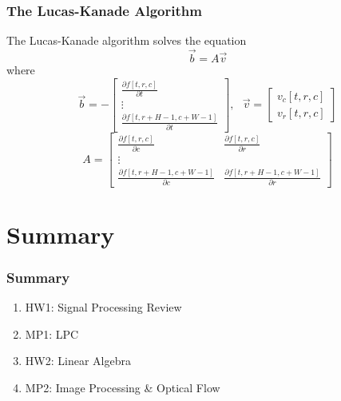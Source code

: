 \documentclass{beamer}
\begin{document}
\begin{frame}
  \frametitle{The Lucas-Kanade Algorithm}

  The Lucas-Kanade algorithm solves the equation
  \[\vec{b}=A\vec{v} \]
  where
  \[
  \vec{b} = -\left[\begin{array}{c}
      \frac{\partial f[t,r,c]}{\partial t}\\
      \vdots\\
      \frac{\partial f[t,r+H-1,c+W-1]}{\partial t}
    \end{array}\right],~~~
  \vec{v}=\left[\begin{array}{c}v_c[t,r,c]\\ v_r[t,r,c]\end{array}\right]
  \]
  \[
  A=\left[\begin{array}{cc}
      \frac{\partial f[t,r,c]}{\partial c}&\frac{\partial f[t,r,c]}{\partial r}\\
      \vdots\\
      \frac{\partial f[t,r+H-1,c+W-1]}{\partial c}&\frac{\partial f[t,r+H-1,c+W-1]}{\partial r}
    \end{array}\right]
  \]
\end{frame}

\section[Summary]{Summary}
\setcounter{subsection}{1}

\begin{frame}
  \frametitle{Summary}
  \begin{enumerate}
  \item HW1: Signal Processing Review
  \item MP1: LPC
  \item HW2: Linear Algebra  
  \item MP2: Image Processing \& Optical Flow
  \end{enumerate}

\end{frame}
\end{document}
